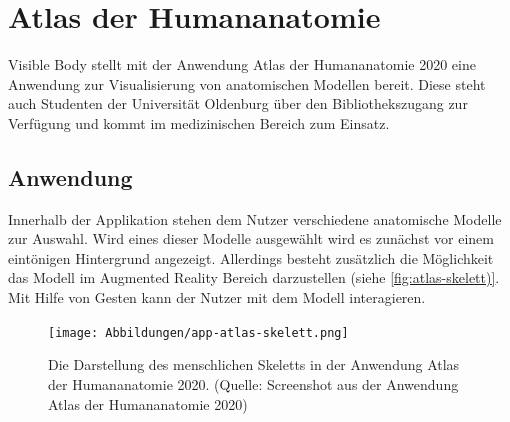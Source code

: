 \section{Atlas der Humananatomie}
Visible Body stellt mit der Anwendung \glqq Atlas der Humananatomie 2020\grqq{} eine Anwendung zur Visualisierung von anatomischen Modellen bereit.  Diese steht auch Studenten der Universität Oldenburg über den Bibliothekszugang zur Verfügung und kommt im medizinischen Bereich zum Einsatz. \\
\subsection{Anwendung}
Innerhalb der Applikation stehen dem Nutzer verschiedene anatomische Modelle zur Auswahl. Wird eines dieser Modelle ausgewählt wird es zunächst vor einem eintönigen Hintergrund angezeigt. Allerdings besteht zusätzlich die Möglichkeit das Modell im Augmented Reality Bereich darzustellen (siehe \ref{fig:atlas-skelett)}. \\
Mit Hilfe von Gesten kann der Nutzer mit dem Modell interagieren.
\begin{figure}[h!]
\centering
\texttt{[image: Abbildungen/app-atlas-skelett.png]}
\caption[Atlas der Humananatomie]{Die Darstellung des menschlichen Skeletts in der Anwendung \glqq Atlas der Humananatomie 2020\grqq . (Quelle: Screenshot aus der Anwendung \glqq Atlas der Humananatomie 2020\grqq )}
\label{fig:atlas-skelett}
\end{figure}


